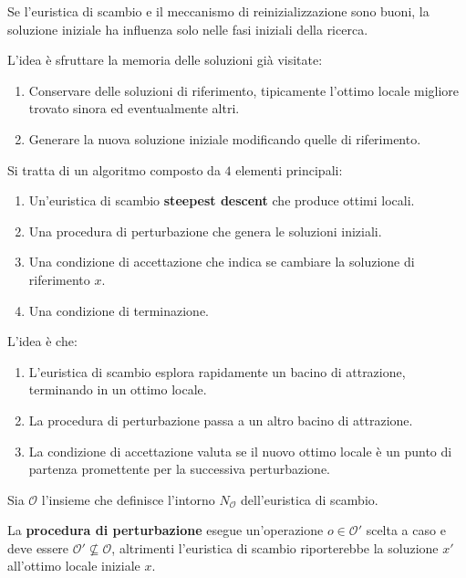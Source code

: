 \documentclass[\main/main.tex]{subfiles}
\begin{document}
\begin{multicols}{2}
\begin{observation}
        Se l'euristica di scambio e il meccanismo di reinizializzazione sono buoni, la soluzione iniziale ha influenza solo nelle fasi iniziali della ricerca.
    \end{observation}
\begin{observation}
    L'idea è sfruttare la memoria delle soluzioni già visitate:
    \begin{enumerate}
        \item Conservare delle soluzioni di riferimento, tipicamente l’ottimo locale migliore trovato sinora ed eventualmente altri.
        \item Generare la nuova soluzione iniziale modificando quelle di riferimento.
    \end{enumerate}
\end{observation}
\begin{definition}
    Si tratta di un algoritmo composto da \(4\) elementi principali:
    \begin{enumerate}
        \item Un'euristica di scambio \textbf{steepest descent} che produce ottimi locali.
        \item Una procedura di perturbazione che genera le soluzioni iniziali.
        \item Una condizione di accettazione che indica se cambiare la soluzione di riferimento \(x\).
        \item Una condizione di terminazione.
    \end{enumerate}
    
    L'idea è che:
    \begin{enumerate}
        \item L'euristica di scambio esplora rapidamente un bacino di attrazione, terminando in un ottimo locale.
        \item La procedura di perturbazione passa a un altro bacino di attrazione.
        \item La condizione di accettazione valuta se il nuovo ottimo locale è un punto di partenza promettente per la successiva perturbazione.
    \end{enumerate}
\end{definition}
\begin{definition}
    Sia \(\mathcal{O}\) l'insieme che definisce l'intorno \(N_{\mathcal{O}}\) dell'euristica di scambio.
    
    La \textbf{procedura di perturbazione} esegue un'operazione \(o \in \mathcal{O}'\) scelta a caso e deve essere \(\mathcal{O}' \not\subseteq \mathcal{O}\), altrimenti l'euristica di scambio riporterebbe la soluzione \(x'\) all'ottimo locale iniziale \(x\).
    

\end{definition}
\end{multicols}
\end{document}
